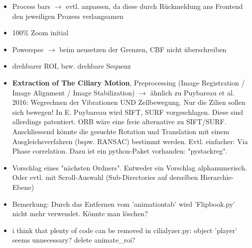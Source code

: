 \documentclass{article}
\begin{document}
\begin{itemize}

\item Process bars $\rightarrow$ evtl. anpassen, da diese durch Rückmeldung ans Frontend 
	den jeweiligen Prozess verlangsamen 
	 
\item 100\% Zoom initial 

\item Powerspec $\rightarrow$ beim neusetzen der Grenzen, CBF nicht überschreiben

\item drehbarer ROI, bzw. drehbare Sequenz 
	 
\item \textbf{Extraction of The Ciliary Motion}, 
Preprocessing (Image Registration / Image Alignment / Image Stabilization) 
$\rightarrow$ ähnlich zu Puybareau et al. 2016: 
Wegrechnen der Vibrationen UND Zellbewegung. Nur die Zilien sollen sich bewegen! 
In E. Puybareau wird SIFT, SURF vorgeschlagen. Diese sind allerdings patentiert. 
ORB wäre eine freie alternative zu SIFT/SURF. Anschliessend könnte die gesuchte 
Rotation und Translation mit einem Ausgleichsverfahren (bspw. RANSAC) bestimmt werden. 
Evtl. einfacher: Via Phase correlation. Dazu ist ein python-Paket vorhanden: "pystackreg". 

\item Vorschlag eines "nächsten Ordners". Entweder ein Vorschlag alphanumerisch. Oder evtl. 
mit Scroll-Auswahl (Sub-Directories auf derselben Hierarchie-Ebene) 

\item Bemerkung: Durch das Entfernen vom 'animationtab' wird 'Flipbook.py' 
nicht mehr verwendet. Könnte man löschen?  

\item i think that plenty of code can be removed in cilialyzer.py: 
	  object 'player' seems unnecessary? delete animate\_roi? 


\end{itemize} 
\end{document}
